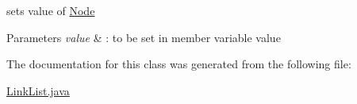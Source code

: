 sets value of \hyperlink{classNode}{Node} 


\begin{DoxyParams}{Parameters}
{\em value} & \+: to be set in member variable \textquotesingle{}value\textquotesingle{} \\
\hline
\end{DoxyParams}


The documentation for this class was generated from the following file\+:\begin{DoxyCompactItemize}
\item 
\hyperlink{LinkList_8java}{Link\+List.\+java}\end{DoxyCompactItemize}
